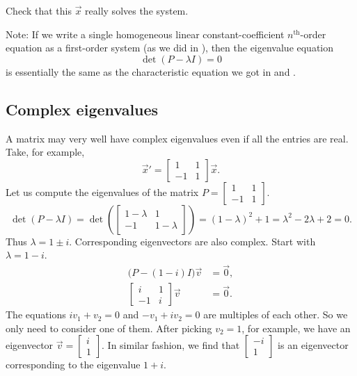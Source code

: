 \begin{exercise}
Check that this $\vec{x}$ really solves the system.
\end{exercise}

Note: If we write a single homogeneous linear constant-coefficient
$n^{\text{th}}$-order equation
as a first-order system (as we did in ),
then the eigenvalue equation
\begin{equation*}
\det(P - \lambda I) = 0
\end{equation*}
is essentially the same as the characteristic equation we got in
 and .

\subsection{Complex eigenvalues}

A matrix may very well have complex eigenvalues even if all the entries are
real.  Take, for example,
\begin{equation*}
{\vec{x}}' = 
\begin{bmatrix}
1 & 1 \\
-1 & 1
\end{bmatrix}
\vec{x} .
\end{equation*}
Let us compute the eigenvalues of
the matrix $P = \left[ \begin{smallmatrix} 1 & 1 \\ -1 & 1 \end{smallmatrix}
\right]$.
\begin{equation*}
\det(P - \lambda I) =
\det\left(
\begin{bmatrix}
1-\lambda & 1 \\
-1 & 1-\lambda
\end{bmatrix}
\right)
= {(1-\lambda)}^2 + 1
= \lambda^2 - 2 \lambda + 2 = 0 .
\end{equation*}
Thus $\lambda = 1 \pm i$.
Corresponding eigenvectors are also complex.
Start with $\lambda = 1-i$.
\begin{align*}
\bigl(P-(1-i) I\bigr) \vec{v} & = \vec{0} , \\
\begin{bmatrix}
i & 1 \\
-1 & i
\end{bmatrix}
\vec{v} & = \vec{0}.
\end{align*}
The equations $i v_1 + v_2 = 0$ and $-v_1 + iv_2 = 0$
are multiples of each other.  So we only need to consider one of them.
After picking $v_2 = 1$, for example, we have an
eigenvector
$\vec{v} = \left[ \begin{smallmatrix} i \\ 1 \end{smallmatrix} \right]$.
In similar fashion, we find that
$\left[ \begin{smallmatrix} -i \\ 1 \end{smallmatrix} \right]$
is an eigenvector corresponding to the eigenvalue $1+i$.

